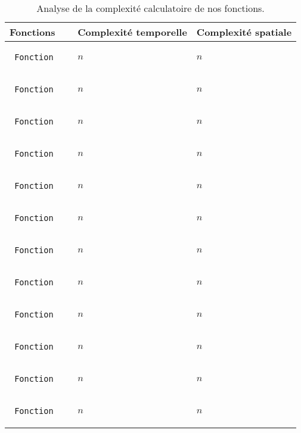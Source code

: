 \documentclass[12pt,a4paper]{article}
\begin{document}
	\begin{table}[ht!]
		\centering
			\begin{tabular}{|p{}|p{0.35\textwidth}|p{}|}
			\hline
			Fonctions																					& Complexité temporelle 				& Complexité spatiale	\\
			\hline
			\begin{verbatim} Fonction	\end{verbatim} 					& $n$ 													& $n$ \\
			\hline
			\begin{verbatim} Fonction	\end{verbatim} 					& $n$ 													& $n$ \\
			\hline 
			\begin{verbatim} Fonction	\end{verbatim} 					& $n$ 													& $n$ \\
			\hline
			\begin{verbatim} Fonction	\end{verbatim} 					& $n$ 													& $n$ \\
			\hline
			\begin{verbatim} Fonction	\end{verbatim} 					& $n$ 													& $n$ \\
			\hline
			\begin{verbatim} Fonction	\end{verbatim} 					& $n$ 													& $n$ \\
			\hline
			\begin{verbatim} Fonction	\end{verbatim} 					& $n$ 													& $n$ \\
			\hline
			\begin{verbatim} Fonction	\end{verbatim} 					& $n$ 													& $n$ \\
			\hline
			\begin{verbatim} Fonction	\end{verbatim} 					& $n$ 													& $n$ \\
			\hline
			\begin{verbatim} Fonction	\end{verbatim} 					& $n$ 													& $n$ \\ 
			\hline
			\begin{verbatim} Fonction	\end{verbatim} 					& $n$ 													& $n$ \\
			\hline
			\begin{verbatim} Fonction	\end{verbatim} 					& $n$ 													& $n$ \\
			\hline
			\end{tabular}
		\caption{Analyse de la complexité calculatoire de nos fonctions.}
	\end{table}
\end{document}
